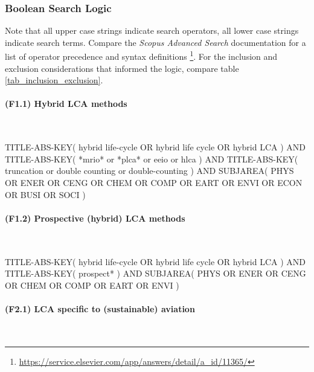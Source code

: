 \documentclass{article}
\begin{document}
    \subsubsection{Boolean Search Logic}
    \label{sub_boolean}
        
        Note that all upper case strings indicate search operators, all lower case strings indicate search terms. Compare the \textit{Scopus Advanced Search} documentation for a list of operator precedence and syntax definitions \footnote{\url{https://service.elsevier.com/app/answers/detail/a_id/11365/}}. For the inclusion and exclusion considerations that informed the logic, compare table \ref{tab_inclusion_exclusion}.
        
        \paragraph{(F1.1) Hybrid LCA methods}
        \ %
        
\begin{code_search}
TITLE-ABS-KEY(
    {hybrid life-cycle}
    OR
    {hybrid life cycle}
    OR
    {hybrid LCA}
)
AND TITLE-ABS-KEY(
    *mrio* or *plca* or eeio or hlca
)
AND TITLE-ABS-KEY(
    {truncation} or {double counting} or {double-counting}
)
AND SUBJAREA(
    PHYS OR ENER OR CENG OR CHEM OR COMP OR EART OR ENVI OR
    ECON OR BUSI OR SOCI
)
\end{code_search}

        \paragraph{(F1.2) Prospective (hybrid) LCA methods}
        \ %
        
\begin{code_search}
TITLE-ABS-KEY(
    {hybrid life-cycle}
    OR
    {hybrid life cycle}
    OR
    {hybrid LCA}
)
AND TITLE-ABS-KEY(
    prospect*
)
AND SUBJAREA(
    PHYS OR ENER OR CENG OR CHEM OR COMP OR EART OR ENVI
)
\end{code_search}

        \paragraph{(F2.1) LCA specific to (sustainable) aviation}
        \ %
            
\end{document}
